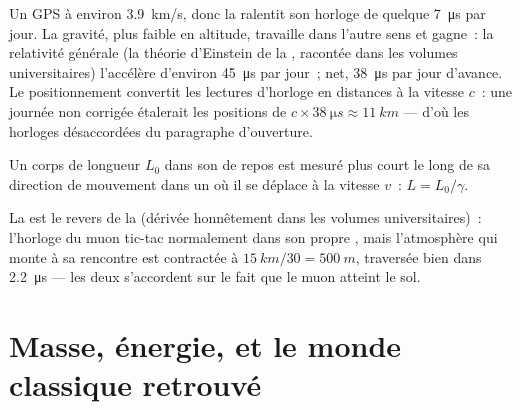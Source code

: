\begin{remark}\label{rem:g12:special-relativity:gps}
Un  GPS
 à environ \qty{3.9}{km/s}, donc la
 ralentit son horloge de
quelque \qty{7}{\micro s} par jour. La gravité, plus faible en
altitude, travaille dans l'autre sens et gagne~: la
relativité générale (la théorie d'Einstein de la
, racontée dans les volumes
universitaires) l'accélère d'environ \qty{45}{\micro s} par jour~; net,
\qty{38}{\micro s} par jour d'avance. Le positionnement convertit les
lectures d'horloge en distances à la vitesse $c$~: une journée non
corrigée étalerait les positions de $c \times \qty{38}{\micro s}
\approx \qty{11}{km}$ --- d'où les horloges désaccordées du paragraphe
d'ouverture.
\end{remark}

\begin{proposition}\label{prop:g12:special-relativity:contraction}
Un corps de longueur $L_0$ dans son  de repos est mesuré
plus court le long de sa direction de mouvement dans un 
où il se déplace à la vitesse $v$~: $L = L_0/\gamma$.
\end{proposition}
\admitted

\begin{remark}\label{rem:g12:special-relativity:muonframe}
La  est le revers de
la  (dérivée honnêtement dans
les volumes universitaires)~: l'horloge du muon tic-tac normalement
dans son propre , mais l'atmosphère qui monte à sa
rencontre est contractée à $\qty{15}{km}/30 = \qty{500}{m}$, traversée
bien dans \qty{2.2}{\micro s} --- les deux  s'accordent
sur le fait que le muon atteint le sol.
\end{remark}

\section{Masse, énergie, et le monde classique retrouvé}

